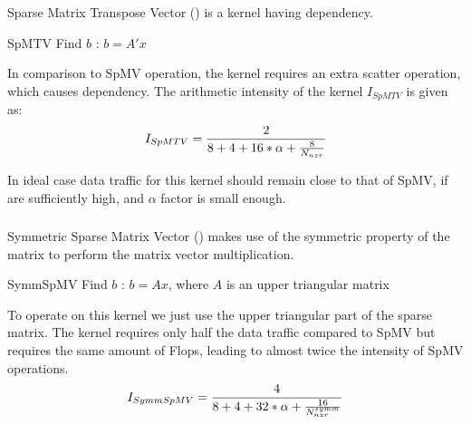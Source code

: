 \subsubsection{\SpMTV}
Sparse Matrix Transpose Vector (\SpMTV) is a kernel having \DTWO dependency.
\begin{algorithm}[H]
	\caption{SpMTV Find $b$ : $b=A'x$} 
	\label{alg:SpMTV}
	\begin{algorithmic}[1]
		\ENDFOR
		\ENDFOR
	\end{algorithmic}
\end{algorithm}
In comparison to SpMV operation, the kernel requires an extra scatter operation, which causes dependency. The arithmetic intensity of the kernel $I_{SpMTV}$ is given as:
\begin{equation}
\label{eq:SpMTV_intensity}
I_{SpMTV} = \frac{2}{8+4+16*\alpha+\frac{8}{\NNZRmath}} \\
\end{equation}

In ideal case data traffic for this kernel should remain close to that of SpMV, if \NNZR are sufficiently high, and $\alpha$ factor is small enough.

\subsubsection{\SymmSpmv}
Symmetric Sparse Matrix Vector (\SymmSpmv) makes use of the symmetric property of the matrix to perform the matrix  vector multiplication.
\begin{algorithm}[H]
	\caption{SymmSpMV Find $b$ : $b=Ax$, where $A$ is an upper triangular matrix} 
	\label{alg:SymmSpMV}
	\begin{algorithmic}[1]
		\ENDFOR
		\ENDFOR
	\end{algorithmic}
\end{algorithm}
To operate on this kernel we just use the upper triangular part of the sparse matrix. The kernel requires only half the data traffic compared to SpMV but requires the same amount of Flops, leading to almost twice the intensity of SpMV operations.
\begin{equation}
\label{eq:SymmSpMV_intensity}
I_{SymmSpMV} = \frac{4}{8+4+32*\alpha+\frac{16}{\NNZRmathSYMM}} \\
\end{equation}

